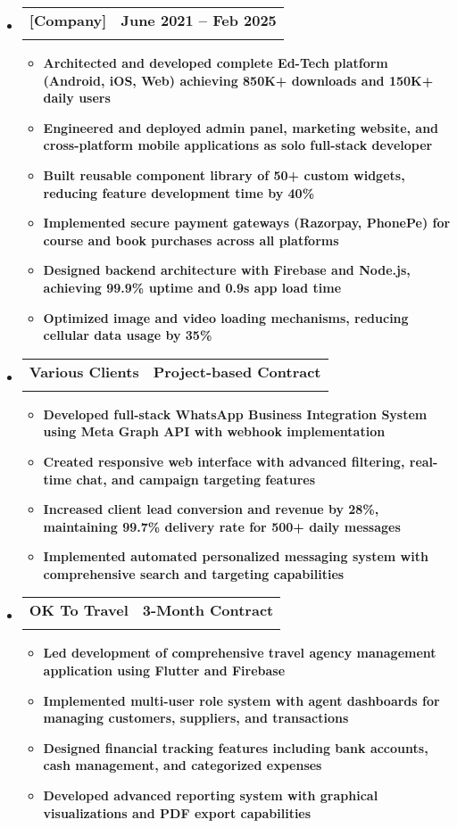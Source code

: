 \documentclass[letterpaper,11pt]{article}
\makeatletter
\newcommand{\resumeItem}[1]{\item\small{\bfseries\color{textblack}#1}\vspace{-2pt}}
\newcommand{\resumeSubheading}[4]{
  \item\small{
    \begin{tabular*}{0.97\textwidth}[t]{l@{\extracolsep{\fill}}r}
      \textbf{\large\color{headingblack}#1} & \textbf{\color{textblack}#2} \\
      \textbf{\color{textblack}\textit{#3}} & \textbf{\color{textblack}\textit{#4}} \\
    \end{tabular*}\vspace{-7pt}
  }
}
\renewcommand{\textbf}[1]{{\bfseries\color{headingblack}#1}}
\renewcommand{\textit}[1]{{\itshape\bfseries\color{textblack}#1}}
\makeatother
\begin{document}
\begin{itemize}[leftmargin=*]
\resumeSubheading
    {[Company]}{June 2021 -- Feb 2025}
    {Senior Full Stack Mobile \& Web Application Developer}{Jaipur, India}
    \begin{itemize}[leftmargin=*]
        \resumeItem{Architected and developed complete Ed-Tech platform (Android, iOS, Web) achieving \textbf{850K+ downloads} and \textbf{150K+ daily users}}
        \resumeItem{Engineered and deployed admin panel, marketing website, and cross-platform mobile applications as solo full-stack developer}
        \resumeItem{Built reusable component library of \textbf{50+ custom widgets}, reducing feature development time by \textbf{40\%}}
        \resumeItem{Implemented secure payment gateways (Razorpay, PhonePe) for course and book purchases across all platforms}
        \resumeItem{Designed backend architecture with Firebase and Node.js, achieving \textbf{99.9\% uptime} and \textbf{0.9s app load time}}
        \resumeItem{Optimized image and video loading mechanisms, reducing cellular data usage by \textbf{35\%}}
    \end{itemize}
    
\vspace{1mm}

\resumeSubheading
    {Various Clients}{Project-based Contract}
    {Freelance Full Stack Developer}{Remote}
    \begin{itemize}[leftmargin=*]
        \resumeItem{Developed full-stack WhatsApp Business Integration System using Meta Graph API with webhook implementation}
        \resumeItem{Created responsive web interface with advanced filtering, real-time chat, and campaign targeting features}
        \resumeItem{Increased client lead conversion and revenue by \textbf{28\%}, maintaining \textbf{99.7\% delivery rate} for \textbf{500+ daily messages}}
        \resumeItem{Implemented automated personalized messaging system with comprehensive search and targeting capabilities}
    \end{itemize}

\vspace{1mm}

\resumeSubheading
    {OK To Travel}{3-Month Contract}
    {Lead Mobile Developer}{Remote}
    \begin{itemize}[leftmargin=*]
        \resumeItem{Led development of comprehensive travel agency management application using Flutter and Firebase}
        \resumeItem{Implemented multi-user role system with agent dashboards for managing customers, suppliers, and transactions}
        \resumeItem{Designed financial tracking features including bank accounts, cash management, and categorized expenses}
        \resumeItem{Developed advanced reporting system with graphical visualizations and PDF export capabilities}
    \end{itemize}
\end{itemize}
\end{document}
